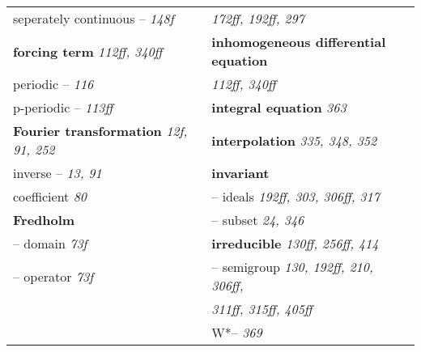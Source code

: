 \documentclass{article}
\begin{document}
\begin{longtable}{p{}p{}}
\quad seperately continuous -- \textit{148f} & \quad \textit{172ff, 192ff, 297} \\
\textbf{forcing term} \textit{112ff, 340ff} & \textbf{inhomogeneous differential equation} \\
\quad periodic -- \textit{116} & \quad \textit{112ff, 340ff} \\
\quad p-periodic -- \textit{113ff} & \textbf{integral equation} \textit{363} \\
\textbf{Fourier transformation} \textit{12f, 91, 252} & \textbf{interpolation} \textit{335, 348, 352} \\
\quad inverse -- \textit{13, 91} & \textbf{invariant} \\
\quad coefficient \textit{80} & \quad -- ideals \textit{192ff, 303, 306ff, 317} \\
\textbf{Fredholm} & \quad -- subset \textit{24, 346} \\
\quad -- domain \textit{73f} & \textbf{irreducible} \textit{130ff, 256ff, 414} \\
\quad -- operator \textit{73f} & \quad -- semigroup \textit{130, 192ff, 210, 306ff,} \\
& \quad\quad \textit{311ff, 315ff, 405ff} \\
& \quad W*-- \textit{369} \\


\end{longtable}
\end{document}

